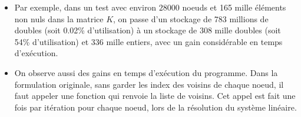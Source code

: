 \begin{itemize}
	\item Par exemple, dans un test avec environ \(28000\) noeuds et 165 mille éléments non nuls dans la matrice \(K\), on passe d'un stockage de 783 millions de doubles (soit 0.02\% d'utilisation) à un stockage de 308 mille doubles (soit 54\% d'utilisation) et 336 mille entiers, avec un gain considérable en temps d'exécution.
	\item On observe aussi des gains en temps d'exécution du programme. Dans la formulation originale, sans garder les index des voisins de chaque noeud, il faut appeler une fonction qui renvoie la liste de voisins. Cet appel est fait une fois par itération pour chaque noeud, lors de la résolution du système linéaire.
\end{itemize}